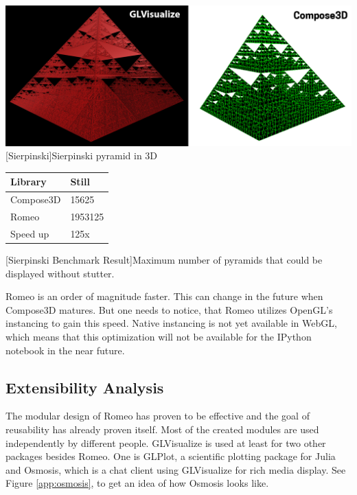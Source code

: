 \begin{minipage}{\linewidth}
    \centering
    \includegraphics[width=\linewidth]{graphics/sierpinsky.jpg}
    [Sierpinski]{Sierpinski pyramid in 3D}
    \label{fig:reactive1}
\end{minipage}
\begin{table}[htbp]
    \centering
    \begin{tabular}{l|l}
        \hline
        \textbf{Library} & \textbf{Still}\\ 
        \hline
        Compose3D        & 15625         \\
        Romeo            & 1953125       \\
        \hline
        \hline
        Speed up         & 125x          \\
    \end{tabular}
    [Sierpinski Benchmark Result]{Maximum number of pyramids that could be displayed without stutter.}
    \label{table:relativespeedoglw}
\end{table}

Romeo is an order of magnitude faster. This can change in the future when Compose3D matures.
But one needs to notice, that Romeo utilizes OpenGL's instancing to gain this speed. Native instancing is not yet available in WebGL, which means that this optimization will not be available for the IPython notebook in the near future.

\subsection{Extensibility Analysis}

The modular design of Romeo has proven to be effective and the goal of reusability has already proven itself.
Most of the created modules are used independently by different people.
GLVisualize is used at least for two other packages besides Romeo. 
One is GLPlot\cite{GLPlot}, a scientific plotting package for Julia and Osmosis\cite{Osmosis}, which is a chat client using GLVisualize for rich media display.
See Figure \ref{app:osmosis}, to get an idea of how Osmosis looks like.

